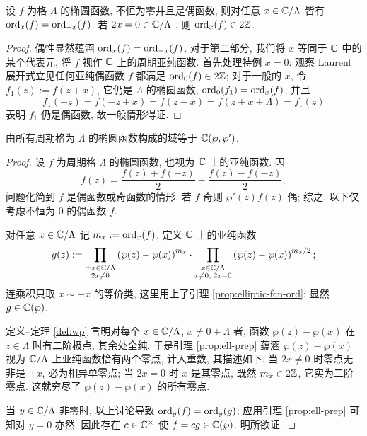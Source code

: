 \begin{lemma}\label{prop:elliptic-fcn-ord}
	设 $f$ 为格 $\Lambda$ 的椭圆函数, 不恒为零并且是偶函数, 则对任意 $x \in \mathbb{C}/\Lambda$ 皆有 $\operatorname*{ord}_x(f) = \operatorname*{ord}_{-x}(f)$. 若 $2x = 0 \in \mathbb{C}/\Lambda$ , 则 $\operatorname*{ord}_x(f) \in 2\mathbb{Z}$.
\end{lemma}
\begin{proof}
	偶性显然蕴涵 $\operatorname*{ord}_x(f) = \operatorname*{ord}_{-x}(f)$. 对于第二部分, 我们将 $x$ 等同于 $\mathbb{C}$ 中的某个代表元, 将 $f$ 视作 $\mathbb{C}$ 上的周期亚纯函数. 首先处理特例 $x=0$: 观察 Laurent 展开式立见任何亚纯偶函数 $f$ 都满足 $\operatorname*{ord}_0(f) \in 2\mathbb{Z}$; 对于一般的 $x$, 令 $f_1(z) := f(z + x)$, 它仍是 $\Lambda$ 的椭圆函数, $\operatorname*{ord}_0(f_1) = \operatorname*{ord}_x(f)$, 并且
	\[ f_1(-z) = f(-z + x) = f(z - x) = f(z + x + \Lambda) = f_1(z) \]
	表明 $f_1$ 仍是偶函数, 故一般情形得证.
\end{proof}

\begin{theorem}\label{prop:wp-field}
	由所有周期格为 $\Lambda$ 的椭圆函数构成的域等于 $\mathbb{C}(\wp, \wp')$.
\end{theorem}
\begin{proof}
	设 $f$ 为周期格 $\Lambda$ 的椭圆函数, 也视为 $\mathbb{C}$ 上的亚纯函数. 因
	\[ f(z) = \dfrac{f(z) + f(-z)}{2} + \dfrac{f(z) - f(-z)}{2}, \]
	问题化简到 $f$ 是偶函数或奇函数的情形. 若 $f$ 奇则 $\wp'(z)f(z)$ 偶; 综之, 以下仅考虑不恒为 $0$ 的偶函数 $f$.
	
	对任意 $x \in \mathbb{C}/\Lambda$ 记 $m_x := \operatorname*{ord}_x(f)$. 定义 $\mathbb{C}$ 上的亚纯函数
	\[ g(z) := \prod_{\substack{\pm x \in \mathbb{C}/\Lambda \\ 2x \neq 0}} \left( \wp(z) - \wp(x) \right)^{m_x} \cdot \prod_{\substack{x \in \mathbb{C}/\Lambda \\ x \neq 0, \; 2x=0}} \left( \wp(z) - \wp(x) \right)^{m_x/2}; \]
	连乘积只取 $x \sim -x$ 的等价类, 这里用上了引理 \ref{prop:elliptic-fcn-ord}; 显然 $g \in \mathbb{C}(\wp)$.
	
	定义--定理 \ref{def:wp} 言明对每个 $x \in \mathbb{C}/\Lambda$, $x \neq 0 + \Lambda$ 者, 函数 $\wp(z) - \wp(x)$ 在 $z \in \Lambda$ 时有二阶极点, 其余处全纯. 于是引理 \ref{prop:ell-prep} 蕴涵 $\wp(z) - \wp(x)$ 视为 $\mathbb{C}/\Lambda$ 上亚纯函数恰有两个零点, 计入重数, 其描述如下. 当 $2x \neq 0$ 时零点无非是 $\pm x$, 必为相异单零点; 当 $2x = 0$ 时 $x$ 是其零点, 既然 $m_x \in 2\mathbb{Z}$, 它实为二阶零点. 这就穷尽了 $\wp(z) - \wp(x)$ 的所有零点.

	当 $y \in \mathbb{C}/\Lambda$ 非零时, 以上讨论导致 $\operatorname*{ord}_y(f) = \operatorname*{ord}_y(g)$; 应用引理 \ref{prop:ell-prep} 可知对 $y=0$ 亦然. 因此存在 $c \in \mathbb{C}^\times$ 使 $f = cg \in \mathbb{C}(\wp)$. 明所欲证.
\end{proof}

